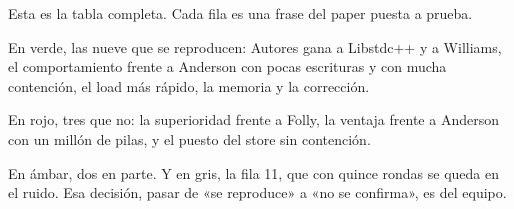 Esta es la tabla completa. Cada fila es una frase del paper puesta a prueba.

En verde, las nueve que se reproducen: Autores gana a Libstdc++ y a Williams, el comportamiento frente a Anderson con pocas escrituras y con mucha contención, el load más rápido, la memoria y la corrección.

En rojo, tres que no: la superioridad frente a Folly, la ventaja frente a Anderson con un millón de pilas, y el puesto del store sin contención.

En ámbar, dos en parte. Y en gris, la fila 11, que con quince rondas se queda en el ruido. Esa decisión, pasar de «se reproduce» a «no se confirma», es del equipo.

